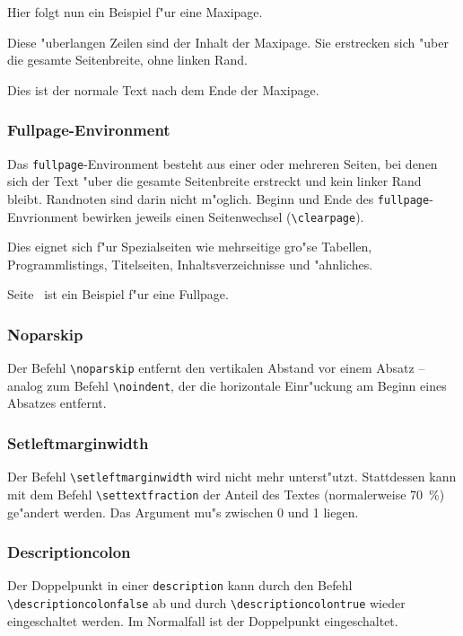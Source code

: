 Hier folgt nun ein Beispiel f"ur eine Maxipage.\nopagebreak
\begin{maxipage}
Diese "uberlangen Zeilen sind der Inhalt der Maxipage. Sie erstrecken 
sich "uber die gesamte Seitenbreite, ohne linken 
Rand.
\end{maxipage}\nopagebreak
Dies ist der normale Text nach dem Ende der Maxipage.

\subsubsection{Fullpage-Environment} \label{fullpage}

Das \texttt{fullpage}-Environment besteht aus einer oder mehreren
Seiten, bei denen sich der Text "uber die gesamte Seitenbreite erstreckt
und kein linker Rand bleibt. Randnoten sind darin nicht m"oglich. Beginn
und Ende des \texttt{fullpage}-Envrionment bewirken jeweils einen
Seitenwechsel (\verb|\clearpage|).

Dies eignet sich f"ur Spezialseiten wie mehrseitige gro"se 
Tabellen, Programmlistings, Titelseiten, Inhaltsverzeichnisse und 
"ahnliches.

Seite~\pageref{bild} ist ein Beispiel f"ur eine Fullpage.

\subsubsection{Noparskip}

Der Befehl \verb|\noparskip| entfernt den vertikalen Abstand vor einem 
Absatz -- analog zum Befehl \verb|\noindent|, der die horizontale 
Einr"uckung am Beginn eines Absatzes entfernt.

\subsubsection{Setleftmarginwidth}

Der Befehl \verb|\setleftmarginwidth| wird nicht mehr unterst"utzt.
Stattdessen kann mit dem Befehl \verb|\settextfraction| der 
Anteil des Textes (normalerweise 70~\%) ge"andert werden. Das 
Argument mu"s zwischen 0 und 1 liegen.

\subsubsection{Descriptioncolon}

Der Doppelpunkt in einer \texttt{description} kann durch den Befehl 
\verb|\descriptioncolonfalse| ab und durch \verb|\descriptioncolontrue| 
wieder eingeschaltet werden. Im Normalfall ist der Doppelpunkt 
eingeschaltet.

